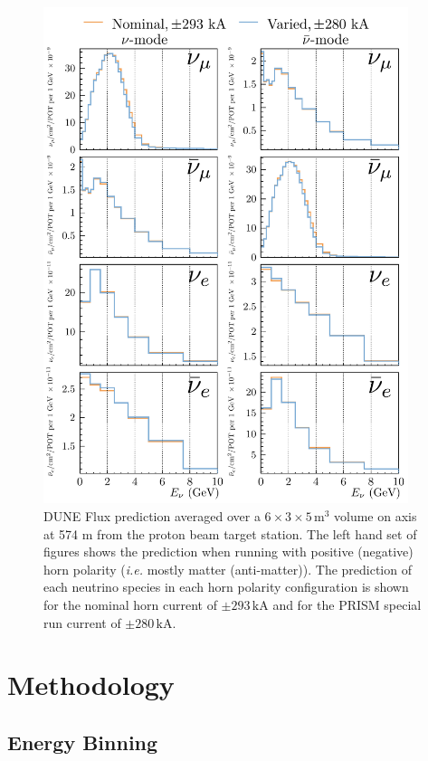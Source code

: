 \documentclass{article}
\begin{document}
\begin{figure}
  \centering
  \includegraphics[width=0.95\textwidth]{plots/fluxpredcompvar/HornCurrentFluxPredictions}
  \caption{DUNE Flux prediction averaged over a $6\times 3\times 5\,\textrm{m}^{3}$ volume on axis at 574 m from the proton beam target station. The left hand set of figures shows the prediction when running with positive (negative) horn polarity (\textit{i.e.} mostly matter (anti-matter)). The prediction of each neutrino species in each horn polarity configuration is shown for the nominal horn current of $\pm293\, \textrm{kA}$ and for the PRISM special run current of $\pm280\, \textrm{kA}$.}
  \label{fig:flux_predictions__on_axis_lower_HC}
\end{figure}

\section{Methodology}

\subsection{Energy Binning}
\end{document}
